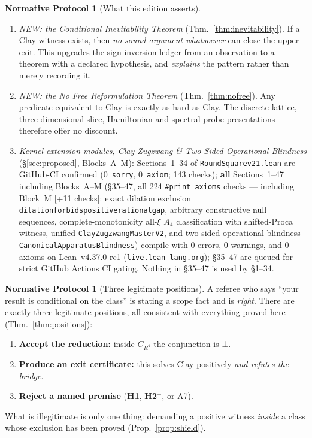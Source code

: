 \documentclass[11pt,a4paper]{article}
\def\R{R}\def\N{N}\def\Q{Q}\def\Z{Z}\def\Class{C}\def\OS{OS}\def\Gap{Gap}%
\theoremstyle{plain}
\theoremstyle{definition}
\newtheorem{protocol}[theorem]{Normative Protocol}
\theoremstyle{remark}
\newcommand{\R}{\mathbb{R}}\newcommand{\N}{\mathbb{N}}\newcommand{\Q}{\mathbb{Q}}
\newcommand{\Z}{\mathbb{Z}}\newcommand{\Spec}{\operatorname{Spec}}
\newcommand{\OS}{\mathrm{OS}}\newcommand{\Gap}{\mathrm{Gap}}
\newcommand{\Class}{\mathcal{C}}\newcommand{\Htot}{\mathcal{H}}
\renewcommand{\_}{\oldunderscore\allowbreak}
\newcommand{\Lean}[1]{\texttt{\small #1}}
\begin{document}
\begin{protocol}[What this edition asserts]
\begin{enumerate}[label=(\arabic*),leftmargin=22pt,itemsep=1pt]
(\S\ref{sec:upper}, \S\ref{sec:attacks}, \S\ref{sec:regulator}). \textbf{None closes it.}
\item \emph{NEW: the Conditional Inevitability Theorem} (Thm.~\ref{thm:inevitability}).
If a Clay witness exists, then \emph{no sound argument whatsoever} can close the upper exit.
This upgrades the sign-inversion ledger from an observation to a theorem with a declared
hypothesis, and \emph{explains} the pattern rather than merely recording it.
\item \emph{NEW: the No Free Reformulation Theorem} (Thm.~\ref{thm:nofree}). Any predicate equivalent to Clay is exactly as hard as Clay. The discrete-lattice, three-dimensional-slice,
Hamiltonian and spectral-probe presentations therefore offer no discount.
\item \emph{Kernel extension modules, Clay Zugzwang \& Two-Sided Operational Blindness} (\S\ref{sec:proposed}, Blocks~A--M): Sections~1--34 of \texttt{RoundSquare\_v21.lean} are GitHub-CI confirmed (0~\texttt{sorry}, 0~\texttt{axiom}; 143 checks); \textbf{all} Sections~1--47 including Blocks~A--M (\S35--47, all 224 \texttt{\#print axioms} checks --- including Block~M [+11 checks]: exact dilation exclusion \Lean{dilation\_forbids\_positive\_rational\_gap}, arbitrary constructive null sequences, complete-monotonicity all-$\xi$ $A_4$ classification with shifted-Proca witness, unified \Lean{ClayZugzwangMasterV2}, and two-sided operational blindness \Lean{CanonicalApparatusBlindness}) compile with 0 errors, 0 warnings, and 0 axioms on Lean~v4.37.0-rc1 (\texttt{live.lean-lang.org}); \S35--47 are queued for strict GitHub Actions CI gating. Nothing in \S35--47 is used by \S1--34.
\end{enumerate}
\end{protocol}
\begin{protocol}[Three legitimate positions]\label{prot:three}
A referee who says ``your result is conditional on the class'' is stating a scope fact and is
\emph{right}. There are exactly three legitimate positions, all consistent with everything proved
here (Thm.~\ref{thm:positions}):
\begin{enumerate}[label=(\Alph*),leftmargin=24pt,itemsep=1pt]
\item \textbf{Accept the reduction:} inside $\Class^-_{\R^4}$ the conjunction is $\bot$.
\item \textbf{Produce an exit certificate:} this solves Clay positively \emph{and refutes the bridge}.
\item \textbf{Reject a named premise} (\textbf{H1}, \textbf{H2$^-$}, or A7).
\end{enumerate}
What is illegitimate is only one thing: demanding a positive witness \emph{inside} a class whose
exclusion has been proved (Prop.~\ref{prop:shield}).
\end{protocol}
\end{document}
